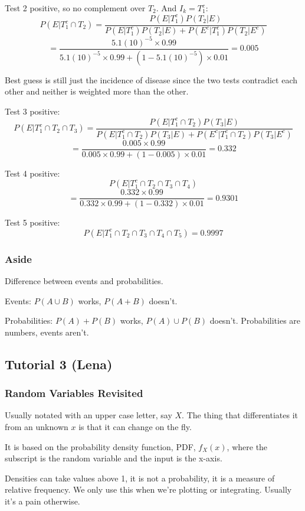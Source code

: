 \documentclass{report}
\begin{document}
\begin{enumerate}[(a)]
Test 2 positive, so no complement over $T_2$. And $I_k = T_1^c$: $$ P(E|T_1^c \cap T_2) =\frac{P(E|T_1^c) P(T_2|E)}{P(E|T_1^c) P(T_2|E) + P(E^c|T_1^c) P(T_2|E^c)}$$ $$= \frac{5.1(10)^{-5} \times 0.99}{5.1(10)^{-5} \times 0.99 + (1-5.1(10)^{-5}) \times 0.01} = 0.005$$

Best guess is still just the incidence of disease since the two tests contradict each other and neither is weighted more than the other.

Test 3 positive: $$P(E|T_1^c \cap T_2 \cap T_3) =\frac{P(E|T_1^c \cap T_2) P(T_3|E)}{P(E|T_1^c \cap T_2) P(T_3|E) + P(E^c|T_1^c \cap T_2) P(T_3|E^c)} $$ $$ = \frac{0.005 \times 0.99}{0.005 \times 0.99 + (1-0.005) \times 0.01} = 0.332 $$

Test 4 positive: $$P(E|T_1^c \cap T_2 \cap T_3 \cap T_4) $$ $$= \frac{0.332 \times 0.99}{0.332 \times 0.99 + (1-0.332) \times 0.01} = 0.9301 $$

Test 5 positive: $$P(E|T_1^c \cap T_2 \cap T_3 \cap T_4 \cap T_5) = 0.9997 $$

\subsubsection*{Aside}

Difference between events and probabilities.

Events: $P(A \cup B)$ works, $P(A+B)$ doesn't.

Probabilities: $P(A) + P(B)$ works, $P(A) \cup P(B)$ doesn't. Probabilities are numbers, events aren't.

\end{enumerate}

\subsection{Tutorial 3 (Lena)}

\subsubsection{Random Variables Revisited}

Usually notated with an upper case letter, say $X$.  The thing that differentiates it from an unknown $x$ is that it can change on the fly.

It is based on the probability density function, PDF, $f_X(x)$, where the subscript is the random variable and the input is the x-axis.

Densities can take values above 1, it is not a probability, it is a measure of relative frequency. We only use this when we're plotting or integrating. Usually it's a pain otherwise.
\end{document}

